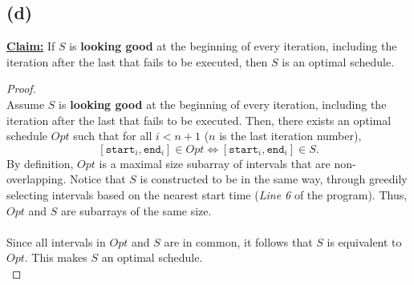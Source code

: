 \documentclass[12pt]{article}
\begin{document}
\subsection*{(d)}
\underline{\textbf{Claim:}} If \( S \) is \textbf{looking good} at the beginning of every iteration, including the iteration after the last that fails to be executed, then \( S \) is an optimal schedule.
\begin{proof}
\leavevmode\\
    Assume \( S \) is \textbf{looking good} at the beginning of every iteration, including the iteration after the last that fails to be executed. Then, there exists an optimal schedule \( Opt \) such that for all \( i < n + 1 \) (\( n \) is the last iteration number),
    \[
        [\texttt{start}_i, \texttt{end}_i] \in Opt \iff [\texttt{start}_i, \texttt{end}_i] \in S \text{.}
    \]
    By definition, \( Opt \) is a maximal size subarray of intervals that are non-overlapping. Notice that \( S \) is constructed to be in the same way, through greedily selecting intervals based on the nearest start time (\textit{Line 6} of the program). Thus, \( Opt \) and \( S \) are subarrays of the same size. \\
    \\
    Since all intervals in \( Opt \) and \( S \) are in common, it follows that \( S \) is equivalent to \( Opt \). This makes \( S \) an optimal schedule. \\
\end{proof}
\end{document}
